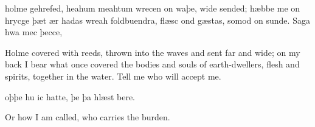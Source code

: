 \documentclass[12pt]{book}
\begin{document}
\begin{pairs}
\begin{Rightside}
\begin{Old English}
\beginnumbering
\pstart
holme gehrefed,      heahum meahtum
wrecen on waþe,      wide sended;
hæbbe me on hrycge      þæt ær hadas wreah
foldbuendra,      flæsc ond gæstas,
somod on sunde.      Saga hwa mec þecce,

\pend
\endnumbering
\end{Old English}
\end{Rightside}
\begin{Leftside}
\begin{English}
\beginnumbering
\pstart
Holme covered with reeds, thrown into the waves and sent far and wide; on my back I bear what once covered the bodies and souls of earth-dwellers, flesh and spirits, together in the water. Tell me who will accept me.
\pend
\endnumbering
\end{English}
\end{Leftside}
\end{pairs}
\Columns
\begin{pairs}
\begin{Rightside}
\begin{Old English}
\beginnumbering
\pstart
oþþe hu ic hatte,      þe þa hlæst bere.
\pend
\endnumbering
\end{Old English}
\end{Rightside}
\begin{Leftside}
\begin{English}
\beginnumbering
\pstart
Or how I am called, who carries the burden.
\pend
\endnumbering
\end{English}
\end{Leftside}
\end{pairs}
\Columns
\end{document}
